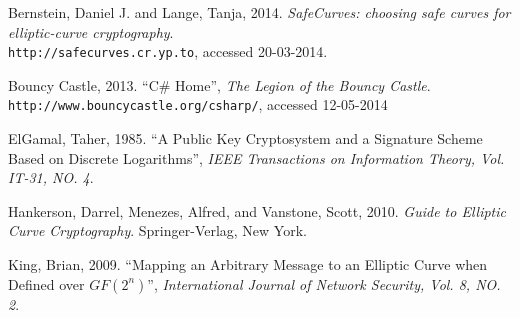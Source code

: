\begin{thebibliography}{9}
	
		Bernstein, Daniel J. and Lange, Tanja,
        2014.
		\emph{SafeCurves: choosing safe curves for elliptic-curve cryptography}. \\
		\verb+http://safecurves.cr.yp.to+,
		accessed 20-03-2014.
        
        Bouncy Castle,
        2013.
        ``C\# Home'',
		\emph{The Legion of the Bouncy Castle}. \\
		\verb|http://www.bouncycastle.org/csharp/|,
        accessed 12-05-2014
		
	    ElGamal, Taher,
        1985.
		``A Public Key Cryptosystem and a Signature Scheme Based on Discrete Logarithms'',
		\emph{IEEE Transactions on Information Theory, Vol. IT-31, NO. 4}.
	
		Hankerson, Darrel, Menezes, Alfred, and Vanstone, Scott,
        2010.
		\emph{Guide to Elliptic Curve Cryptography}.
		Springer-Verlag, New York.
		
		King, Brian,
        2009.
		``Mapping an Arbitrary Message to an Elliptic Curve when Defined over \(GF(2^n)\)'',
		\emph{International Journal of Network Security, Vol. 8, NO. 2}.
	
\end{thebibliography}